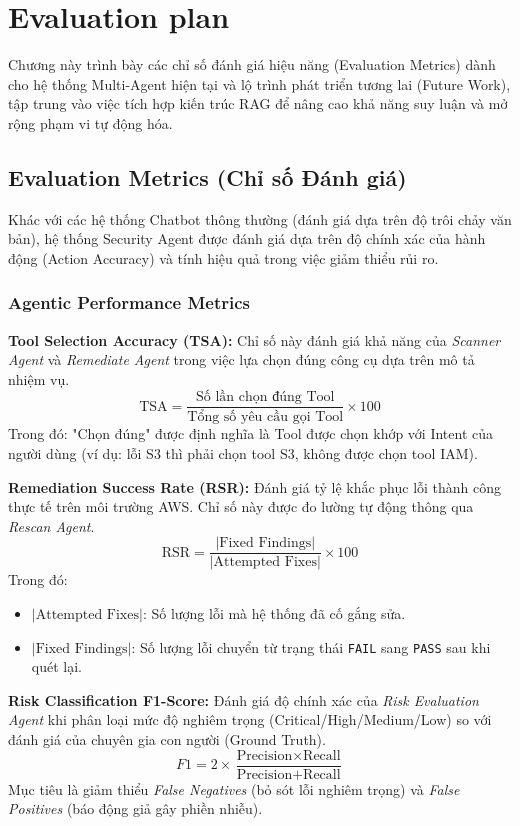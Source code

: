 \chapter{Evaluation plan}

Chương này trình bày các chỉ số đánh giá hiệu năng (Evaluation Metrics) dành cho hệ thống Multi-Agent hiện tại và lộ trình phát triển tương lai (Future Work), tập trung vào việc tích hợp kiến trúc RAG để nâng cao khả năng suy luận và mở rộng phạm vi tự động hóa.

\section{Evaluation Metrics (Chỉ số Đánh giá)}

Khác với các hệ thống Chatbot thông thường (đánh giá dựa trên độ trôi chảy văn bản), hệ thống Security Agent được đánh giá dựa trên độ chính xác của hành động (Action Accuracy) và tính hiệu quả trong việc giảm thiểu rủi ro.

\subsection{Agentic Performance Metrics}

\textbf{Tool Selection Accuracy (TSA):}
Chỉ số này đánh giá khả năng của \textit{Scanner Agent} và \textit{Remediate Agent} trong việc lựa chọn đúng công cụ dựa trên mô tả nhiệm vụ.
\[
\text{TSA} = \frac{\text{Số lần chọn đúng Tool}}{\text{Tổng số yêu cầu gọi Tool}} \times 100
\]
Trong đó: "Chọn đúng" được định nghĩa là Tool được chọn khớp với Intent của người dùng (ví dụ: lỗi S3 thì phải chọn tool S3, không được chọn tool IAM).

\textbf{Remediation Success Rate (RSR):}
Đánh giá tỷ lệ khắc phục lỗi thành công thực tế trên môi trường AWS. Chỉ số này được đo lường tự động thông qua \textit{Rescan Agent}.
\[
\text{RSR} = \frac{| \text{Fixed Findings} |}{| \text{Attempted Fixes} |} \times 100
\]
Trong đó:
\begin{itemize}
    \item $| \text{Attempted Fixes} |$: Số lượng lỗi mà hệ thống đã cố gắng sửa.
    \item $| \text{Fixed Findings} |$: Số lượng lỗi chuyển từ trạng thái \texttt{FAIL} sang \texttt{PASS} sau khi quét lại.
\end{itemize}

\textbf{Risk Classification F1-Score:}
Đánh giá độ chính xác của \textit{Risk Evaluation Agent} khi phân loại mức độ nghiêm trọng (Critical/High/Medium/Low) so với đánh giá của chuyên gia con người (Ground Truth).
\[
F1 = 2 \times \frac{\text{Precision} \times \text{Recall}}{\text{Precision} + \text{Recall}}
\]
Mục tiêu là giảm thiểu \textit{False Negatives} (bỏ sót lỗi nghiêm trọng) và \textit{False Positives} (báo động giả gây phiền nhiễu).

